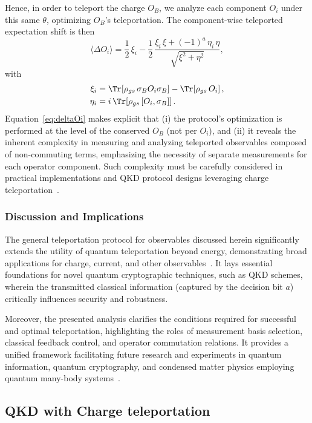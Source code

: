 Hence, in order to teleport the charge $O_B$, we analyze each component $O_i$ under this same $\theta$, optimizing $O_B$'s teleportation. The component-wise teleported expectation shift is then
\begin{equation}
\label{eq:deltaOi}
\langle \Delta O_i \rangle
= \frac{1}{2}\,\xi_i
- \frac{1}{2}\,\frac{\xi_i\,\xi + (-1)^a\,\eta_i\,\eta}{\sqrt{\xi^2+\eta^2}},
\end{equation}
with
\begin{align}
\xi_i &= \Tr\!\left[\rho_{gs}\,\sigma_B O_i \sigma_B\right]-\Tr\!\left[\rho_{gs}\,O_i\right], \\
\eta_i &= i\,\Tr\!\left[\rho_{gs}\,[O_i,\sigma_B]\right].
\end{align}
Equation~\eqref{eq:deltaOi} makes explicit that (i) the protocol’s optimization is performed at the level of the conserved $O_B$ (not per $O_i$), and (ii) it reveals the inherent complexity in measuring and analyzing teleported observables composed of non-commuting terms, emphasizing the necessity of separate measurements for each operator component. Such complexity must be carefully considered in practical implementations and QKD protocol designs leveraging charge teleportation~\cite{QKDbyQET,IkedaTeleportingCharge}.

\subsubsection{Discussion and Implications}

The general teleportation protocol for observables discussed herein significantly extends the utility of quantum teleportation beyond energy, demonstrating broad applications for charge, current, and other observables~\cite{IkedaTeleportingCharge}. It lays essential foundations for novel quantum cryptographic techniques, such as QKD schemes, wherein the transmitted classical information (captured by the decision bit $a$) critically influences security and robustness.

Moreover, the presented analysis clarifies the conditions required for successful and optimal teleportation, highlighting the roles of measurement basis selection, classical feedback control, and operator commutation relations. It provides a unified framework facilitating future research and experiments in quantum information, quantum cryptography, and condensed matter physics employing quantum many-body systems~\cite{Hotta2011,Ikeda2023,QKDbyQET}.

\subsection{QKD with Charge teleportation}

